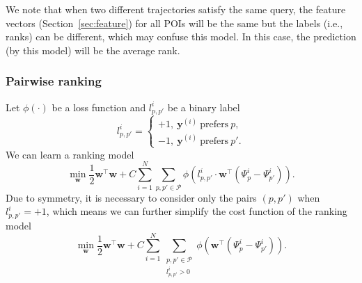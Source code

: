 We note that when two different trajectories satisfy the same query, the feature vectors (Section~\ref{sec:feature}) for all POIs will be the same 
but the labels (i.e., ranks) can be different, which may confuse this model. In this case, the prediction (by this model) will be the average rank.




\subsubsection{Pairwise ranking}
\label{sec:rank}

Let $\phi(\cdot)$ be a loss function and $l_{p,p'}^i$ be a binary label
\begin{equation*}
l_{p,p'}^i = \begin{cases}
+1,~ \mathbf{y}^{(i)} ~\text{prefers}~ p, \\
-1,~ \mathbf{y}^{(i)} ~\text{prefers}~ p'.
\end{cases}
\end{equation*}
We can learn a ranking model
\begin{equation*}
\min_{\mathbf{w}} \frac{1}{2} \mathbf{w}^\top \mathbf{w} +  
C \sum_{i=1}^N \sum_{p, p' \in \mathcal{P}} \phi \left( l_{p,p'}^i \cdot \mathbf{w}^\top (\Psi_p^i - \Psi_{p'}^i) \right).
\end{equation*}
Due to symmetry, it is necessary to consider only the pairs $(p, p')$ when $l_{p, p'}^i = +1$, which means we can further simplify 
the cost function of the ranking model
\begin{equation*}
\min_{\mathbf{w}} \frac{1}{2} \mathbf{w}^\top \mathbf{w} +  
C \sum_{i=1}^N \sum_{\substack{p, p' \in \mathcal{P} \\ l_{p,p'}^i > 0}} \phi \left(\mathbf{w}^\top (\Psi_p^i - \Psi_{p'}^i) \right).
\end{equation*}

